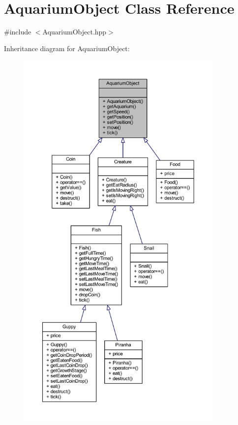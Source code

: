 \hypertarget{class_aquarium_object}{}\section{Aquarium\+Object Class Reference}
\label{class_aquarium_object}


{\ttfamily \#include $<$Aquarium\+Object.\+hpp$>$}



Inheritance diagram for Aquarium\+Object\+:
\nopagebreak
\begin{figure}[H]
\begin{center}
\leavevmode
\includegraphics[height=550pt]{class_aquarium_object__inherit__graph}
\end{center}
\end{figure}


